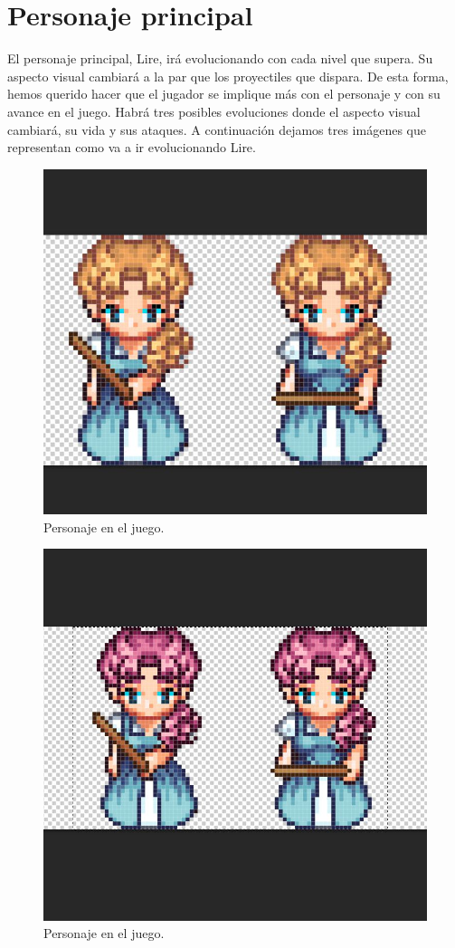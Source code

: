 \section{Personaje principal}
El personaje principal, Lire, irá evolucionando con cada nivel que supera. Su aspecto visual cambiará a la par que los proyectiles que dispara. De esta forma, hemos querido hacer que el jugador se implique más con el personaje y con su avance en el juego. Habrá tres posibles evoluciones donde el aspecto visual cambiará, su vida y sus ataques. A continuación dejamos tres imágenes que representan como va a ir evolucionando Lire.
\newpage
\begin{figure}[!htb]
  \centering
    \includegraphics[width=0.7\linewidth]{./img/pers11.JPG}
    \caption{Personaje en el juego.}
  \label{fig:yo}
\end{figure}
\begin{figure}[!htb]
  \centering
    \includegraphics[width=0.7\linewidth]{./img/pers1.JPG}
    \caption{Personaje en el juego.}
  \label{fig:yo}
\end{figure}
